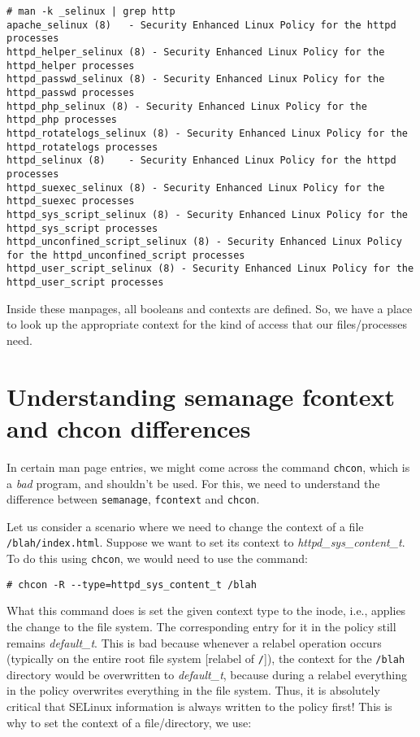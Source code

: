 \vspace{-15pt}
\begin{verbatim}
# man -k _selinux | grep http
apache_selinux (8)   - Security Enhanced Linux Policy for the httpd processes
httpd_helper_selinux (8) - Security Enhanced Linux Policy for the httpd_helper processes
httpd_passwd_selinux (8) - Security Enhanced Linux Policy for the httpd_passwd processes
httpd_php_selinux (8) - Security Enhanced Linux Policy for the httpd_php processes
httpd_rotatelogs_selinux (8) - Security Enhanced Linux Policy for the httpd_rotatelogs processes
httpd_selinux (8)    - Security Enhanced Linux Policy for the httpd processes
httpd_suexec_selinux (8) - Security Enhanced Linux Policy for the httpd_suexec processes
httpd_sys_script_selinux (8) - Security Enhanced Linux Policy for the httpd_sys_script processes
httpd_unconfined_script_selinux (8) - Security Enhanced Linux Policy for the httpd_unconfined_script processes
httpd_user_script_selinux (8) - Security Enhanced Linux Policy for the httpd_user_script processes
\end{verbatim}
\vspace{-10pt}

\noindent
Inside these manpages, all booleans and contexts are defined. So, we have a place to look up the appropriate context for the kind of access that our files/processes need. 

\section{Understanding semanage fcontext and chcon differences}
In certain man page entries, we might come across the command \verb|chcon|, which is a \textit{bad} program, and shouldn't be used. For this, we need to understand the difference between \verb|semanage|, \verb|fcontext| and \verb|chcon|. 

Let us consider a scenario where we need to change the context of a file \verb|/blah/index.html|. Suppose we want to set its context to \textit{httpd\_sys\_content\_t}. To do this using \verb|chcon|, we would need to use the command:

\vspace{-15pt}
\begin{verbatim}
# chcon -R --type=httpd_sys_content_t /blah
\end{verbatim}
\vspace{-10pt}

\noindent
What this command does is set the given context type to the inode, i.e., applies the change to the file system. The corresponding entry for it in the policy still remains \textit{default\_t}. This is bad because whenever a relabel operation occurs (typically on the entire root file system [relabel of \verb|/|]), the context for the \verb|/blah| directory would be overwritten to \textit{default\_t}, because during a relabel everything in the policy overwrites everything in the file system. Thus, it is absolutely critical that SELinux information is always written to the policy first! This is why to set the context of a file/directory, we use:

